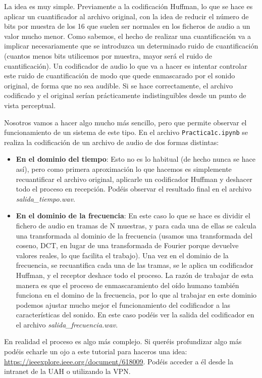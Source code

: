 \documentclass[es,practica]{uah}
\begin{document}
La idea es muy simple. Previamente a la codificación Huffman, lo que se hace es aplicar un cuantificador al archivo original, con la idea de reducir el número de bits por muestra de los 16 que suelen ser normales en los ficheros de audio a un valor mucho menor. Como sabemos, el hecho de realizar una cuantificación va a implicar necesariamente que se introduzca un determinado ruido de cuantificación (cuantos menos bits utilicemos por muestra, mayor será el ruido de cuantificación). Un codificador de audio lo que va a hacer es intentar controlar este ruido de cuantificación de modo que quede enmascarado por el sonido original, de forma que no sea audible. Si se hace correctamente, el archivo codificado y el original serían prácticamente indistinguibles desde un punto de vista perceptual. 

Nosotros vamos a hacer algo mucho más sencillo, pero que permite observar el funcionamiento de un sistema de este tipo. En el archivo \texttt{Practica1c.ipynb} se realiza la codificación de un archivo de audio de dos formas distintas:

\begin{itemize}
	\item {\bf En el dominio del tiempo}: Esto no es lo habitual (de hecho nunca se hace así), pero como primera aproximación lo que hacemos es simplemente recuantificar el archivo original, aplicarle un codificador Huffman y deshacer todo el proceso en recepción. Podéis observar el resultado final en el archivo \emph{salida_tiempo.wav}.
	\item {\bf En el dominio de la frecuencia}: En este caso lo que se hace es dividir el fichero de audio en tramas de N muestras, y para cada una de ellas se calcula una transformada al dominio de la frecuencia (usamos una transformada del coseno, DCT, en lugar de una transformada de Fourier porque devuelve valores reales, lo que facilita el trabajo). Una vez en el dominio de la frecuencia, se recuantifica cada una de las tramas, se le aplica un codificador Huffman, y el receptor deshace todo el proceso. La razón de trabajar de esta manera es que el proceso de enmascaramiento del oído humano también funciona en el domino de la frecuencia, por lo que al trabajar en este dominio podemos ajustar mucho mejor el funcionamiento del codificador a las características del sonido. En este caso podéis ver la salida del codificador en el archivo \emph{salida_frecuencia.wav}.
\end{itemize}


En realidad el proceso es algo más complejo. Si queréis profundizar algo más podéis echarle un ojo a este tutorial para haceros una idea: \url{https://ieeexplore.ieee.org/document/618009}. Podéis acceder a él desde la intranet de la UAH o utilizando la VPN. 
\end{document}
